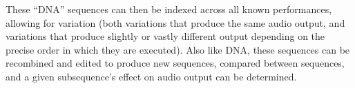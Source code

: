 \documentclass[10pt]{article}
\begin{document}
\begin{multicols*}{2}
  These ``DNA'' sequences can then be indexed across all known
  performances, allowing for variation (both variations that produce
  the same audio output, and variations that produce slightly or
  vastly different output depending on the precise order in which they
  are executed). Also like DNA, these sequences can be recombined and
  edited to produce new sequences, compared between sequences, and a
  given subsequence's effect on audio output can be determined.







\end{multicols*}
\end{document}
